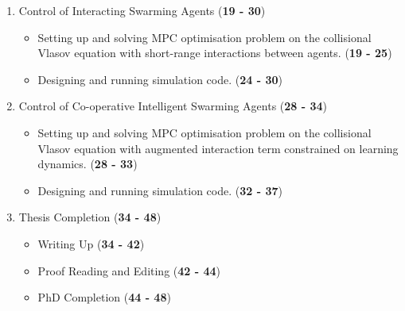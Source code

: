 \documentclass[.../main.tex]{subfiles}
\begin{document}
\begin{enumerate}
		\item Control of Interacting Swarming Agents (\textbf{19 - 30})
		\begin{itemize}
			\item Setting up and solving MPC optimisation problem on the collisional Vlasov
			equation with short-range interactions between agents. (\textbf{19 - 25})
			\item Designing and running simulation code. (\textbf{24 - 30})
		\end{itemize}

		\item Control of Co-operative Intelligent Swarming Agents (\textbf{28 - 34})
		\begin{itemize}
			\item Setting up and solving MPC optimisation problem on the collisional Vlasov
			equation with augmented interaction term constrained on learning dynamics. (\textbf{28 -
			33})
			\item Designing and running simulation code. (\textbf{32 - 37})
		\end{itemize}

		\item Thesis Completion (\textbf{34 - 48})
		\begin{itemize}
			\item Writing Up (\textbf{34 - 42})
			\item Proof Reading and Editing (\textbf{42 - 44})
			\item PhD Completion (\textbf{44 - 48})
		\end{itemize}

	\end{enumerate}
\end{document}
